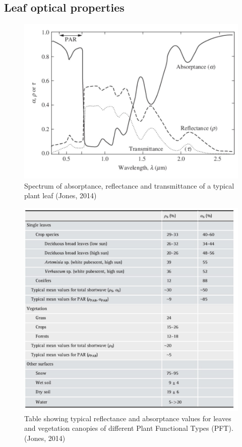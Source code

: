 \documentclass[12pt,oneside]{book}
\begin{document}
\subsection{Leaf optical properties}\label{leaf-optical-properties}

\begin{figure}

{\centering \includegraphics[width=0.8\linewidth]{figures/chap3/f37_leaf_optical} 

}

\caption{Spectrum of absorptance, reflectance and transmittance of a typical plant leaf (Jones, 2014)}\label{fig:f37b}
\end{figure}

\begin{figure}

{\centering \includegraphics[width=0.8\linewidth]{figures/chap3/f38_table_optical} 

}

\caption{Table showing typical reflectance and absorptance values for leaves and vegetation canopies of different Plant Functional Types (PFT).(Jones, 2014)}\label{fig:f38}
\end{figure}
\end{document}
